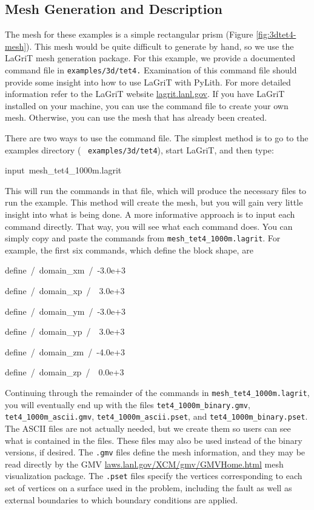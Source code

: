 \subsection{Mesh Generation and Description}

The mesh for these examples is a simple rectangular prism (Figure
\ref{fig:3dtet4-mesh}). This mesh would be quite difficult to generate
by hand, so we use the LaGriT mesh generation package. For this example,
we provide a documented command file in \texttt{examples/3d/tet4.}
Examination of this command file should provide some insight into
how to use LaGriT with PyLith. For more detailed information refer
to the LaGriT website \url{lagrit.lanl.gov}. If you have LaGriT installed
on your machine, you can use the command file to create your own mesh.
Otherwise, you can use the mesh that has already been created.

There are two ways to use the command file. The simplest method is
to go to the\textsf{ }examples directory (\texttt{}~\linebreak{}
\texttt{examples/3d/tet4}), start LaGriT, and then type:
\begin{lyxcode}
input~mesh\_tet4\_1000m.lagrit
\end{lyxcode}
This will run the commands in that file, which will produce the necessary
files to run the example. This method will create the mesh, but you
will gain very little insight into what is being done. A more informative
approach is to input each command directly. That way, you will see
what each command does. You can simply copy and paste the commands
from \texttt{mesh\_tet4\_1000m.lagrit}. For example, the first six
commands, which define the block shape, are
\begin{lyxcode}
define~/~domain\_xm~/~-3.0e+3

define~/~domain\_xp~/~~3.0e+3

define~/~domain\_ym~/~-3.0e+3

define~/~domain\_yp~/~~3.0e+3

define~/~domain\_zm~/~-4.0e+3

define~/~domain\_zp~/~~0.0e+3~
\end{lyxcode}
Continuing through the remainder of the commands in \texttt{mesh\_tet4\_1000m.lagrit},
you will eventually end up with the files \texttt{tet4\_1000m\_binary.gmv},
\texttt{tet4\_1000m\_ascii.gmv}, \texttt{tet4\_1000m\_ascii.pset},
and \texttt{tet4\_1000m\_binary.pset}. The ASCII files are not actually
needed, but we create them so users can see what is contained in the
files. These files may also be used instead of the binary versions,
if desired. The \texttt{.gmv} files define the mesh information, and
they may be read directly by the GMV \url{laws.lanl.gov/XCM/gmv/GMVHome.html}
mesh visualization package. The \texttt{.pset} files specify the vertices
corresponding to each set of vertices on a surface used in the problem,
including the fault as well as external boundaries to which boundary
conditions are applied.

